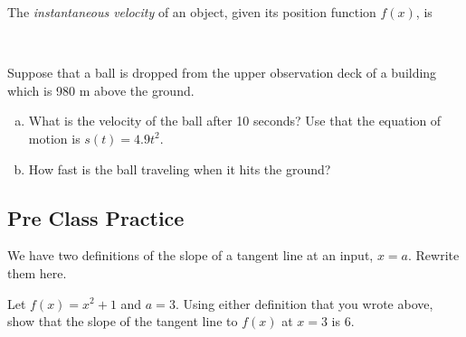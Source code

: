 \documentclass[notes]{subfiles}
\begin{document}
		\begin{rmk}
			The \emph{instantaneous velocity} of an object, given its position function \(f(x)\), is
			
				\\ \( \)\vspace{.55in} 
		\end{rmk}	
		
		\begin{ex}
			Suppose that a ball is dropped from the upper observation deck of a building which is 980 m above the ground.
			\begin{enumerate}[(a)]
				\item What is the velocity of the ball after 10 seconds?  Use that the equation of motion is \(s(t) = 4.9t^2\).
				\item How fast is the ball traveling when it hits the ground?
			\end{enumerate}
		\end{ex}
			\newpage
			
	\subsection*{Pre Class Practice}
		\begin{ex}
			We have two definitions of the slope of a tangent line at an input, \(x = a\).  Rewrite them here.
		\end{ex}
			\vs{1}
			
		\begin{ex}
			Let \(f(x) = x^2 + 1\) and \(a = 3\). Using either definition that you wrote above, show that the slope of the tangent line to \(f(x)\) at \(x=3\) is 6.
		\end{ex}
		
\end{document}
